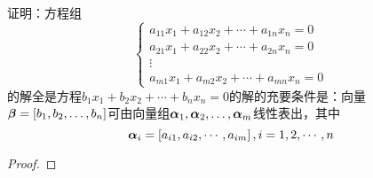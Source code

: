 \begin{problem}
证明：方程组
\begin{equation*}
    \begin{cases}
        a_{11}x_1+a_{12}x_2+\cdots+a_{1n}x_n=0 \\
        a_{21}x_1+a_{22}x_2+\cdots+a_{2n}x_n=0 \\
        \vdots                                 \\
        a_{m1}x_1+a_{m2}x_2+\cdots+a_{mn}x_n=0
    \end{cases}
\end{equation*}
的解全是方程\(b_1x_1+b_2x_2+\cdots+b_nx_n=0\)的解的充要条件是：向量\(\boldsymbol{\beta}=\left[ {b}_1,{b}_2,\dots,{b}_{n} \right]\)可由向量组\({\boldsymbol{\alpha}}_1,{\boldsymbol{\alpha}}_2,\dots,{\boldsymbol{\alpha}}_{m}\)线性表出，其中
\begin{equation*}
    \boldsymbol{\alpha}_i=\left[ a_{i1},a_{i2},\cdots,a_{im} \right],i=1,2,\cdots,n
\end{equation*}
\end{problem}
\begin{proof}

\end{proof}

